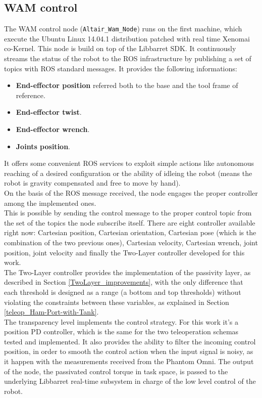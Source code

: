 \subsection{WAM control}\label{WAM_contol}
The WAM control node (\texttt{Altair\_Wam\_Node}) runs on the first machine, which execute the Ubuntu Linux 14.04.1 distribution patched with real time Xenomai co-Kernel.
This node is build on top of the Libbarret SDK. It continuously streams the status of the robot to the ROS infrastructure by publishing a set of topics with ROS standard messages.  It provides the following informations:
\begin{itemize}
	\item \textbf{End-effector position} referred both to the base and the tool frame of reference.
	\item\textbf{ End-effector twist}.
	\item \textbf{End-effector wrench}.
	\item \textbf{Joints position}.
\end{itemize}
It offers some convenient ROS services to exploit simple actions like autonomous reaching of a desired configuration or the ability of idleing the robot (means the robot is gravity compensated and free to move by hand).\\
On the basis of the ROS message received, the node engages the proper controller among the implemented ones.\\
This is possible by sending the control message to the proper control topic from the set of the topics the node subscribe itself.
There are eight controller available right now: Cartesian position, Cartesian orientation, Cartesian pose (which is the combination of the two previous ones), Cartesian velocity, Cartesian wrench, joint position, joint velocity and finally the Two-Layer controller developed for this work.\\
The Two-Layer controller provides the implementation of the passivity layer, as described in Section \ref{TwoLayer_improvements}, with the only difference that each threshold is designed as a range (a bottom and top thresholds) without violating the constraints between these variables, as explained in Section \ref{teleop_Ham-Port-with-Tank}.\\
The transparency level implements the control strategy. For this work it's a position PD controller, which is the same for the two teleoperation schemas tested and implemented.
It also provides the ability to filter the incoming control position, in order to smooth the control action when the input signal is noisy, as it happen with the measurements received from the Phantom Omni.
The output of the node, the passivated control torque in task space,  is passed to the underlying Libbarret real-time subsystem in charge of the low level control of the robot.

